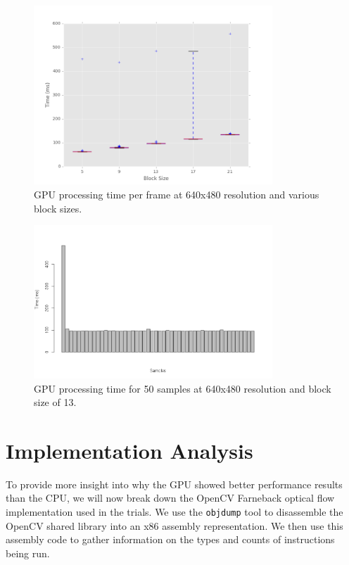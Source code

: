 \documentclass[12pt,letterpaper]{article}
\begin{document}
\begin{figure}[H]
  \centering
    \includegraphics[width=0.8\textwidth]{img/gpu_blocksize.png}
  \caption{GPU processing time per frame at 640x480 resolution and various block sizes.}
  \label{fig:gpublock}
\end{figure}

\begin{figure}[H]
  \centering
    \includegraphics[width=0.8\textwidth]{img/cudaloading.png}
  \caption{GPU processing time for 50 samples at 640x480 resolution and block size of 13.}
  \label{fig:cudaload}
\end{figure}

\section{Implementation Analysis}
To provide more insight into why the GPU showed better performance results than
the CPU, we will now break down the OpenCV Farneback optical flow implementation
used in the trials. We use the \texttt{objdump} tool to disassemble the OpenCV
shared library into an x86 assembly representation. We then use this assembly
code to gather information on the types and counts of instructions being run.
\end{document}
